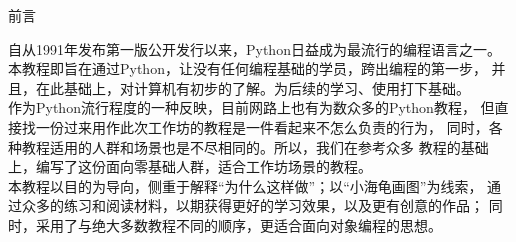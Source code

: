 \begin{center}
    {\Large 前言}
\end{center}

自从1991年发布第一版公开发行以来，Python日益成为最流行的编程语言之一。
本教程即旨在通过Python，让没有任何编程基础的学员，跨出编程的第一步，
并且，在此基础上，对计算机有初步的了解。为后续的学习、使用打下基础。\\
作为Python流行程度的一种反映，目前网路上也有为数众多的Python教程，
但直接找一份过来用作此次工作坊的教程是一件看起来不怎么负责的行为，
同时，各种教程适用的人群和场景也是不尽相同的。所以，我们在参考众多
教程的基础上，编写了这份面向零基础人群，适合工作坊场景的教程。\\
本教程以目的为导向，侧重于解释“为什么这样做”；以“小海龟画图”为线索，
通过众多的练习和阅读材料，以期获得更好的学习效果，以及更有创意的作品；
同时，采用了与绝大多数教程不同的顺序，更适合面向对象编程的思想。
